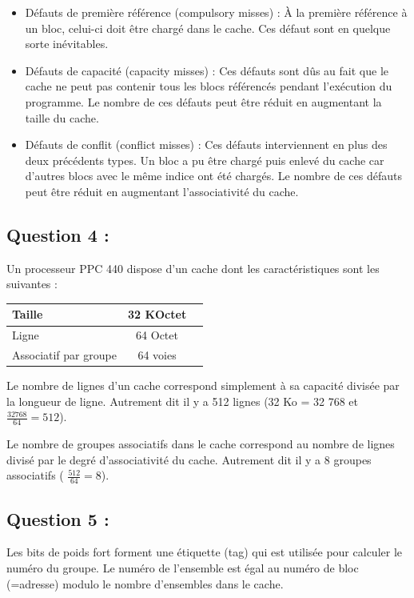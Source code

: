 \documentclass[11pt,a4paper]{article}
\begin{document}
\begin{itemize}
    \item Défauts de première référence (compulsory misses) : À la première
      référence à un bloc, celui-ci doit être chargé dans le cache. Ces défaut
      sont en quelque sorte inévitables.
    \item Défauts de capacité (capacity misses) : Ces défauts sont dûs au fait
      que le cache ne peut pas contenir tous les blocs référencés pendant
      l'exécution du programme. Le nombre de ces défauts peut être réduit en
      augmentant la taille du cache.
    \item Défauts de conflit (conflict misses) : Ces défauts interviennent en
      plus des deux précédents types. Un bloc a pu être chargé puis enlevé du
      cache car d'autres blocs avec le même indice ont été chargés. Le nombre de
      ces défauts peut être réduit en augmentant l'associativité du cache.
\end{itemize}
    
    \subsection{Question 4 :}

Un processeur PPC 440 dispose d’un cache dont les caractéristiques sont les
suivantes : \\

\begin{center}
    \begin{tabular}{|l|c|r|}
      \hline
      Taille & 32 KOctet \\
      \hline
      Ligne & 64 Octet\\
      Associatif par groupe & 64 voies \\
      \hline
    \end{tabular}
\end{center}
\vspace{5pt}
Le nombre de lignes d’un cache correspond simplement à sa capacité divisée par
la longueur de ligne. Autrement dit il y a 512 lignes (32 Ko = 32 768 et $
\frac{32768}{64} = 512 $).

Le nombre de groupes associatifs dans le cache correspond au nombre de lignes
divisé par le degré d’associativité du cache. Autrement dit il y a 8 groupes
associatifs ( $ \frac{512}{64} = 8 $).

    \subsection{Question 5 :}
Les bits de poids fort forment une étiquette (tag) qui est utilisée pour
calculer le numéro du groupe. Le numéro de l’ensemble est égal au numéro de bloc
(=adresse) modulo le nombre d’ensembles dans le cache.
\end{document}
